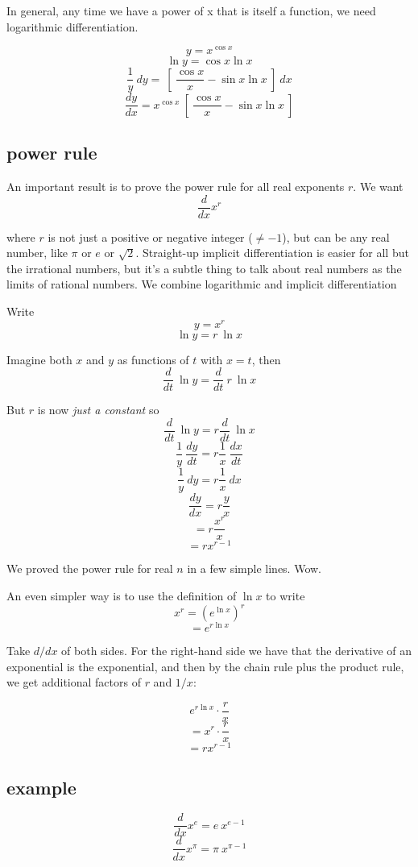 \documentclass[11pt, oneside]{article}
\begin{document}
In general, any time we have a power of x that is itself a function, we need logarithmic differentiation.

\[ y = x^{\cos x} \]
\[ \ln y = \cos x \ln x \]
\[ \frac{1}{y} \ dy = \ [ \ \frac{\cos x}{x} - \sin x \ln x \ ] \ dx \]
\[ \frac{dy}{dx} = x^{\cos x} \ [ \ \frac{\cos x}{x} - \sin x \ln x \ ]  \]

\subsection*{power rule}

An important result is to prove the power rule for all real exponents $r$.  We want
\[   \frac{d}{dx} x^r \]

where $r$ is not just a positive or negative integer ($\ne -1$), but can be any real number, like $\pi$ or $e$ or $\sqrt{2}$.  Straight-up implicit differentiation is easier for all but the irrational numbers, but it's a subtle thing to talk about real numbers as the limits of rational numbers.  We combine logarithmic and implicit differentiation

Write
\[ y = x^r \]
\[ \ln y = r \ \ln x \]

Imagine both $x$ and $y$ as functions of $t$ with $x = t$, then
\[ \frac{d}{dt} \ \ln y = \frac{d}{dt} \  r \ \ln x \]

But $r$ is now \emph{just a constant} so
\[ \frac{d}{dt} \ \ln y =  r \frac{d}{dt} \ \ln x \]
\[ \frac{1}{y} \ \frac{dy}{dt} = r  \frac{1}{x} \ \frac{dx}{dt} \]
\[ \frac{1}{y} \ dy = r \frac{1}{x} \ dx \]
\[ \frac{dy}{dx} = r  \frac{y}{x} \]
\[  = r  \frac{x^r}{x} \]
\[ = r  x^{r-1} \]

We proved the power rule for real $n$ in a few simple lines.  Wow.

An even simpler way is to use the definition of $\ln x$ to write
\[ x^r = (e^{\ln x})^r \]
\[ = e^{r \ln x} \]

Take $d/dx$ of both sides.  For the right-hand side we have that the derivative of an exponential is the exponential, and then by the chain rule plus the product rule, we get additional factors of $r$ and $1/x$:

\[ e^{r \ln x} \cdot \frac{r}{x} \]
\[ = x^r  \cdot \frac{r}{x} \]
\[ = r  x^{r-1} \]

\subsection*{example}

\[   \frac{d}{dx} x^{e} = e \ x^{e - 1}  \]
\[   \frac{d}{dx} x^{\pi} = \pi \ x^{\pi - 1}  \]
\end{document}
